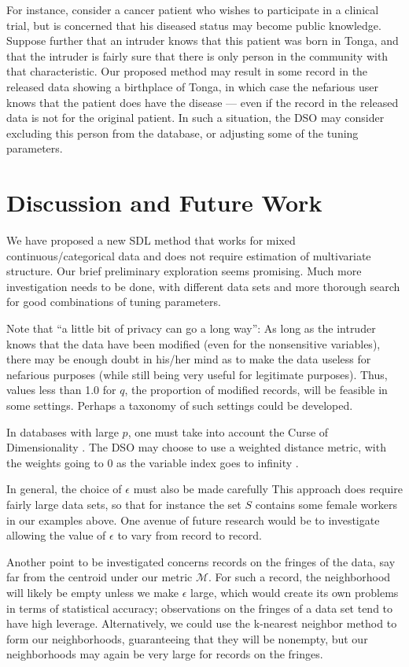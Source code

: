 \documentclass[11pt]{article}
\begin{document}
For instance, consider a cancer patient who wishes to participate in a
clinical trial, but is concerned that his diseased status may become
public knowledge.  Suppose further that an intruder knows that this
patient was born in Tonga, and that the intruder is fairly sure that
there is only person in the community with that characteristic.  Our
proposed method may result in some record in the released data showing a
birthplace of Tonga, in which case the nefarious user knows that the
patient does have the disease --- even if the record in the released
data is not for the original patient.  In such a situation, the DSO may
consider excluding this person from the database, or adjusting some of
the tuning parameters.

\section{Discussion and Future Work}

We have proposed a new SDL method that works for mixed
continuous/categorical data and does not require estimation of
multivariate structure.  Our brief preliminary exploration seems
promising.  Much more investigation needs to be done, with different
data sets and more thorough search for good combinations of tuning
parameters.

Note that ``a little bit of privacy can go a long way'':  As long as the
intruder knows that the data have been modified (even for the
nonsensitive variables), there may be enough doubt in his/her mind as to
make the data useless for nefarious purposes (while still being very
useful for legitimate purposes).  Thus, values less than 1.0 for $q$,
the proportion of modified records, will be feasible in some settings.
Perhaps a taxonomy of such settings could be developed.

In databases with large $p$, one must take into account the Curse of
Dimensionality \cite{beyer}.  The DSO may choose to use a weighted
distance metric, with the weights going to 0 as the variable index goes
to infinity \cite{matloff2015}.

In general, the choice of $\epsilon$ must also be made carefully This
approach does require fairly large data sets, so that for instance the
set $S$ contains some female workers in our examples above.  One avenue
of future research would be to investigate allowing the value of
$\epsilon$ to vary from record to record.  

Another point to be investigated concerns records on the fringes of the
data, say far from the centroid under our metric $\mathcal{M}$.  For
such a record, the neighborhood will likely be empty unless we make
$\epsilon$ large, which would create its own problems in terms of
statistical accuracy; observations on the fringes of a data set tend to
have high leverage.  Alternatively, we could use the k-nearest neighbor
method to form our neighborhoods, guaranteeing that they will be
nonempty, but our neighborhoods may again be very large for records on
the fringes.
\end{document}
